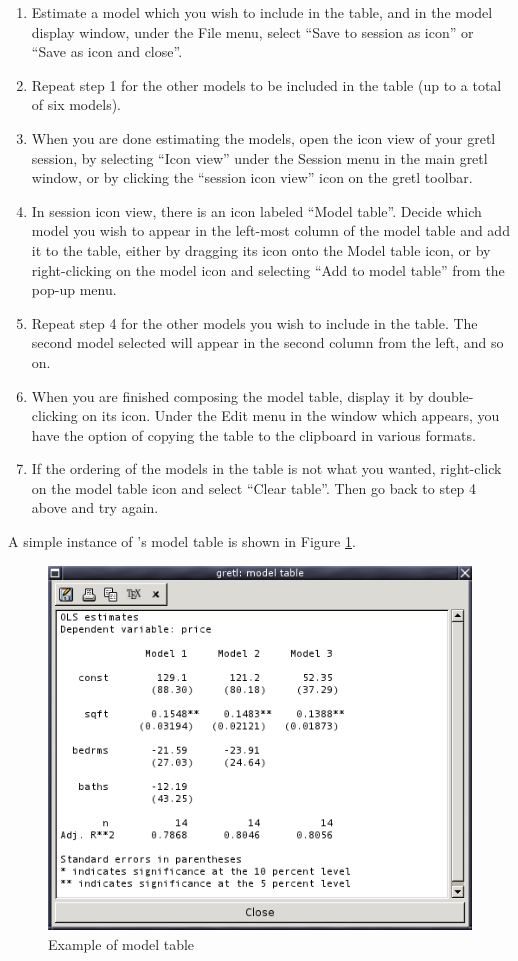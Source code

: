 \begin{enumerate}
\item Estimate a model which you wish to include in the table, and in
  the model display window, under the File menu, select ``Save to
  session as icon'' or ``Save as icon and close''.
\item Repeat step 1 for the other models to be included in the table
  (up to a total of six models).
\item When you are done estimating the models, open the icon view of
  your gretl session, by selecting ``Icon view'' under the Session
  menu in the main gretl window, or by clicking the ``session icon
  view'' icon on the gretl toolbar.
\item In session icon view, there is an icon labeled ``Model table''.
  Decide which model you wish to appear in the left-most column of the
  model table and add it to the table, either by dragging its icon
  onto the Model table icon, or by right-clicking on the model icon
  and selecting ``Add to model table'' from the pop-up menu.
\item Repeat step 4 for the other models you wish to include in the
  table.  The second model selected will appear in the second column
  from the left, and so on.
\item When you are finished composing the model table, display it by
  double-clicking on its icon.  Under the Edit menu in the window
  which appears, you have the option of copying the table to the
  clipboard in various formats.
\item If the ordering of the models in the table is not what you
  wanted, right-click on the model table icon and select ``Clear
  table''.  Then go back to step 4 above and try again.
\end{enumerate}

A simple instance of 's model table is shown in Figure
\ref{fig-model-table}.
\begin{figure}[htbp]
  \caption{Example of model table}
  \label{fig-model-table}
  \begin{center}
    \includegraphics[scale=0.5]{figures/model_table}
  \end{center}
\end{figure}



